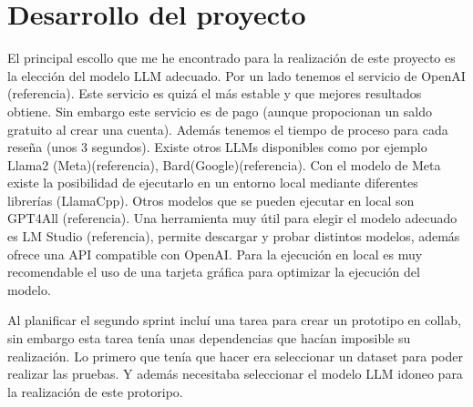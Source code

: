 \section{Desarrollo del proyecto}

El principal escollo que me he encontrado para la realización de este proyecto es la elección del modelo
LLM adecuado. Por un lado tenemos el servicio de OpenAI (referencia). Este servicio es quizá el más estable y que 
mejores resultados obtiene. Sin embargo este servicio es de pago (aunque propocionan un saldo gratuito al crear una cuenta).
Además tenemos el tiempo de proceso para cada reseña (unos 3 segundos).
Existe otros LLMs disponibles como por ejemplo Llama2 (Meta)(referencia), Bard(Google)(referencia).
Con el modelo de Meta existe la posibilidad de ejecutarlo en un entorno local mediante diferentes librerías (LlamaCpp).
Otros modelos que se pueden ejecutar en local son GPT4All (referencia).
Una herramienta muy útil para elegir el modelo adecuado es LM Studio (referencia), permite descargar y probar distintos modelos,
además ofrece una API compatible con OpenAI. 
Para la ejecución en local es muy recomendable el uso de una tarjeta gráfica para optimizar la ejecución del modelo.



Al planificar el segundo sprint incluí una tarea para crear un prototipo en collab, 
sin embargo esta tarea tenía unas dependencias que hacían imposible su realización.
Lo primero que tenía que hacer era seleccionar un dataset para poder realizar las pruebas.
Y además necesitaba seleccionar el modelo LLM idoneo para la realización de este protoripo.
